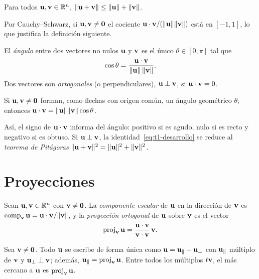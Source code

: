 \begin{corolario}\label{cor:triangular}
Para todos $\mathbf{u},\mathbf{v}\in\mathbb{R}^n$, $\lVert\mathbf{u}+\mathbf{v}\rVert\le\lVert\mathbf{u}\rVert+\lVert\mathbf{v}\rVert$.
\end{corolario}

Por Cauchy--Schwarz, si $\mathbf{u},\mathbf{v}\neq\mathbf{0}$ el cociente $\mathbf{u}\cdot\mathbf{v}/(\lVert\mathbf{u}\rVert\lVert\mathbf{v}\rVert)$ está en $[-1,1]$, lo que justifica la definición siguiente.

\begin{definicion}\label{def:angulo}
El \emph{ángulo} entre dos vectores no nulos $\mathbf{u}$ y $\mathbf{v}$ es el único $\theta\in[0,\pi]$ tal que
\[
\cos\theta=\frac{\mathbf{u}\cdot\mathbf{v}}{\lVert\mathbf{u}\rVert\,\lVert\mathbf{v}\rVert} .
\]
Dos vectores son \emph{ortogonales} (o perpendiculares), $\mathbf{u}\perp\mathbf{v}$, si $\mathbf{u}\cdot\mathbf{v}=0$.
\end{definicion}

\begin{proposicion}\label{prop:coseno}
Si $\mathbf{u},\mathbf{v}\neq\mathbf{0}$ forman, como flechas con origen común, un ángulo geométrico $\theta$, entonces $\mathbf{u}\cdot\mathbf{v}=\lVert\mathbf{u}\rVert\lVert\mathbf{v}\rVert\cos\theta$.
\end{proposicion}

Así, el signo de $\mathbf{u}\cdot\mathbf{v}$ informa del ángulo: positivo si es agudo, nulo si es recto y negativo si es obtuso. Si $\mathbf{u}\perp\mathbf{v}$, la identidad~\eqref{eq:t1-desarrollo} se reduce al \emph{teorema de Pitágoras} $\lVert\mathbf{u}+\mathbf{v}\rVert^2=\lVert\mathbf{u}\rVert^2+\lVert\mathbf{v}\rVert^2$.

\addtocounter{definicion}{1}%

\section{Proyecciones}

\begin{definicion}\label{def:proyeccion}
Sean $\mathbf{u},\mathbf{v}\in\mathbb{R}^n$ con $\mathbf{v}\neq\mathbf{0}$. La \emph{componente escalar} de $\mathbf{u}$ en la dirección de $\mathbf{v}$ es $\operatorname{comp}_{\mathbf{v}}\mathbf{u}=\mathbf{u}\cdot\mathbf{v}/\lVert\mathbf{v}\rVert$, y la \emph{proyección ortogonal} de $\mathbf{u}$ sobre $\mathbf{v}$ es el vector
\[
\operatorname{proj}_{\mathbf{v}}\mathbf{u}=\frac{\mathbf{u}\cdot\mathbf{v}}{\mathbf{v}\cdot\mathbf{v}}\,\mathbf{v} .
\]
\end{definicion}

\begin{proposicion}\label{prop:descomposicion}
Sea $\mathbf{v}\neq\mathbf{0}$. Todo $\mathbf{u}$ se escribe de forma única como $\mathbf{u}=\mathbf{u}_\parallel+\mathbf{u}_\perp$ con $\mathbf{u}_\parallel$ múltiplo de $\mathbf{v}$ y $\mathbf{u}_\perp\perp\mathbf{v}$; además, $\mathbf{u}_\parallel=\operatorname{proj}_{\mathbf{v}}\mathbf{u}$. Entre todos los múltiplos $t\mathbf{v}$, el más cercano a $\mathbf{u}$ es $\operatorname{proj}_{\mathbf{v}}\mathbf{u}$.
\end{proposicion}

